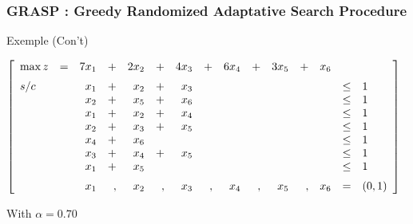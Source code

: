 \documentclass[]{beamer}
\begin{document}
\begin{frame}
  \frametitle{GRASP : Greedy Randomized Adaptative Search Procedure}{Exemple (Con't)}
\vspace{3mm}

{\scriptsize
\begin{center}
$
\left [
\begin{array}{lcrrrrrrrrrrrrllll}
%
   \max z & =  & 7x_1 &+& 2 x_2 &+& 4 x_3 &+&  6 x_4 &+& 3 x_5 &+& x_6 \vspace{2mm}\\	

%
  s/c  & &  x_1 &+&  x_2 &+&  x_3  && && && & \le & 1   \\
         & &  x_2 &+&  x_5 &+&  x_6  & &&&&&&\le & 1   \\
         & &  x_1 &+&  x_2 &+& x_4  && &&&& & \le & 1  \\
         & &  x_2 &+&  x_3 &+&  x_5 && &&&&& \le & 1  \\
         & &  x_4 &+&  x_6 &&&           &&&&  && \le & 1  \\
         & &  x_3 &+&  x_4 &+&  x_5 &&&&&& & \le & 1  \\
         & &  x_1 &+&  x_5  && &&          &&&  && \le & 1  \vspace{2mm} \\

  & &  x_1&,& x_2&,& x_3&,& x_4&,& x_5&,& x_6 & = &(0,1)\\

\end{array}
\right ]
$ 
\end{center}
}
\vspace{5mm}

With $\alpha=0.70$

\end{frame}
\end{document}
